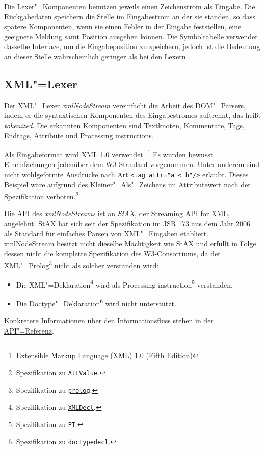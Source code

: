 \documentclass[10pt,a4paper,ngerman,titlepage,tocindentauto]{scrartcl}
\newcommand{\xmlNote}[2]{\footnote{Spezifikation zu \href{http://www.w3.org/TR/2008/REC-xml-20081126/\#{#1}}{\texttt{#2}}.}}
\begin{document}
		Die Lexer"=Komponenten benutzen jeweils einen Zeichenstrom als Eingabe. Die Rückgabedaten speichern die
		Stelle im Eingabestrom an der sie standen, so dass spätere Komponenten, wenn sie einen Fehler
		in der Eingabe feststellen, eine geeignete Meldung samt Position ausgeben können.
		Die Symboltabelle verwendet dasselbe Interface, um die Eingabeposition zu speichern, jedoch ist
		die Bedeutung an dieser Stelle wahrscheinlich geringer als bei den Lexern.
		
		\subsection{XML"=Lexer}
			Der XML"=Lexer {\em xmlNodeStream} vereinfacht die Arbeit des DOM"=Parsers, indem er die syntaxtischen
			Komponenten des Eingabestromes auftrennt, das heißt {\em tokenized}.
			Die erkannten Komponenten sind Textknoten, Kommentare, Tags, Endtags, Attribute und Processing instructions.
			
			Als Eingabeformat wird XML 1.0 verwendet.%
			\footnote{\href{http://www.w3.org/TR/2008/REC-xml-20081126/}{Extensible Markup Language (XML) 1.0 (Fifth Edition)}}
			Es wurden bewusst Eineinfachungen jedenüber dem W3-Standard vorgenommen. Unter anderem sind
			nicht wohlgeformte Ausdrücke nach Art \verb|<tag attr="a < b"/>| erlaubt.
			Dieses Beispiel wäre aufgrund des Kleiner"=Als"=Zeichens im Attributewert
			nach der Spezifikation verboten.\xmlNote{NT-AttValue}{AttValue}
			
			Die API des {\em xmlNodeStreams} ist an {\em StAX}, der \href{http://stax.codehaus.org/}{Streaming API for XML},
			angelehnt. StAX hat sich seit der Spezifikation im \href{http://jcp.org/en/jsr/detail?id=173}{JSR 173} aus
			dem Jahr 2006 als Standard für einfaches Parsen von XML"=Eingaben etabliert.
			xmlNodeStream besitzt nicht dieselbe Mächtigkeit wie StAX und erfüllt in Folge dessen
			nicht die komplette Spezifikation des W3-Consortiums, da der XML"=Prolog\xmlNote{xmldoc}{prolog}
			nicht als solcher verstanden wird:
			\begin{itemize}
				\item
					Die XML"=Deklaration\xmlNote{NT-XMLDecl}{XMLDecl} wird als
					Processing instruction\xmlNote{NT-PI}{PI} verstanden.
				\item
					Die Doctype"=Deklaration\xmlNote{NT-doctypedecl}{doctypedecl} wird nicht unterstützt.
			\end{itemize}
			Konkretere Informationen über den Informationsfluss stehen in der \hyperlink{XML-Lexer-API}{API"=Referenz}.
			
\end{document}
